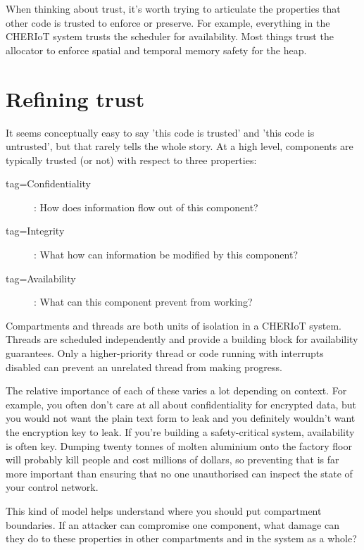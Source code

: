 When thinking about trust, it's worth trying to articulate the properties that other code is trusted to enforce or preserve.
For example, everything in the CHERIoT system trusts the scheduler for availability.
Most things trust the allocator to enforce spatial and temporal memory safety for the heap.

\section{Refining trust}

It seems conceptually easy to say 'this code is trusted' and 'this code is untrusted', but that rarely tells the whole story.
At a high level, components are typically trusted (or not) with respect to three properties:

\begin{description}
	\item[tag=Confidentiality]{: How does information flow out of this component?}
	\item[tag=Integrity]{: What how can information be modified by this component?}
	\item[tag=Availability]{: What can this component prevent from working?}
\end{description}

\begin{note}
Compartments and threads are both units of isolation in a CHERIoT system.
Threads are scheduled independently and provide a building block for availability guarantees.
Only a higher-priority thread or code running with interrupts disabled can prevent an unrelated thread from making progress.
\end{note}

The relative importance of each of these varies a lot depending on context.
For example, you often don't care at all about confidentiality for encrypted data, but you would not want the plain text form to leak and you definitely wouldn't want the encryption key to leak.
If you're building a safety-critical system, availability is often key.
Dumping twenty tonnes of molten aluminium onto the factory floor will probably kill people and cost millions of dollars, so preventing that is far more important than ensuring that no one unauthorised can inspect the state of your control network.

This kind of model helps understand where you should put compartment boundaries.
If an attacker can compromise one component, what damage can they do to these properties in other compartments and in the system as a whole?

